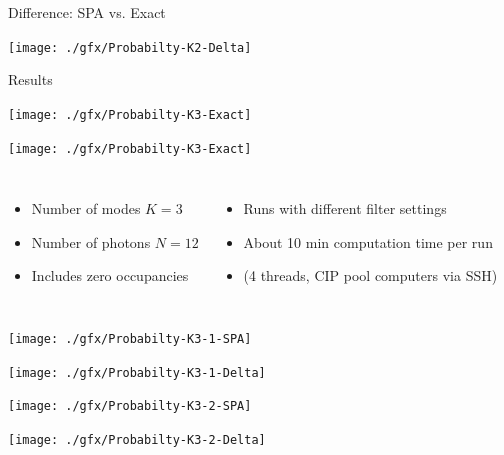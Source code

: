 \begin{frame}{Difference: SPA vs. Exact}
%
\begin{center}
	\texttt{[image: ./gfx/Probabilty-K2-Delta]}
\end{center}
%
\end{frame}


\begin{frame}{Results}
%
\begin{minipage}{.49\linewidth}
	\texttt{[image: ./gfx/Probabilty-K3-Exact]}
\end{minipage}
%
\begin{minipage}{.49\linewidth}
	\texttt{[image: ./gfx/Probabilty-K3-Exact]}
\end{minipage}
%
\begin{columns}[t]
\begin{itemize}
\item Number of modes $K = 3$
\item Number of photons $N = 12$
\item Includes zero occupancies
\end{itemize}
%
\begin{itemize}
\item Runs with different filter settings
\item About 10 min computation time per run
\item (4 threads, CIP pool computers via SSH)
\end{itemize}
\end{columns}
%
\end{frame}


\begin{frame}
%
\begin{minipage}{.49\linewidth}
	\texttt{[image: ./gfx/Probabilty-K3-1-SPA]}
\end{minipage}
%
\begin{minipage}{.49\linewidth}
	\texttt{[image: ./gfx/Probabilty-K3-1-Delta]}
\end{minipage}
%
\begin{minipage}{.49\linewidth}
	\texttt{[image: ./gfx/Probabilty-K3-2-SPA]}
\end{minipage}
%
\begin{minipage}{.49\linewidth}
	\texttt{[image: ./gfx/Probabilty-K3-2-Delta]}
\end{minipage}
%
%
%
\end{frame}

